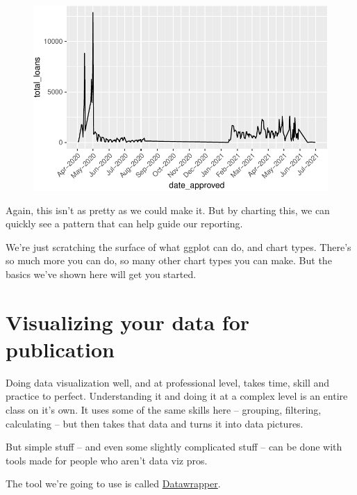 \documentclass[
  letterpaper,
  DIV=11,
  numbers=noendperiod]{scrreprt}
\begin{document}
\begin{figure}[H]

{\centering \includegraphics{./visualizing-for-reporting_files/figure-pdf/unnamed-chunk-15-1.pdf}

}

\end{figure}

Again, this isn't as pretty as we could make it. But by charting this,
we can quickly see a pattern that can help guide our reporting.

We're just scratching the surface of what ggplot can do, and chart
types. There's so much more you can do, so many other chart types you
can make. But the basics we've shown here will get you started.


\hypertarget{visualizing-your-data-for-publication}{%
\chapter{Visualizing your data for
publication}\label{visualizing-your-data-for-publication}}

Doing data visualization well, and at professional level, takes time,
skill and practice to perfect. Understanding it and doing it at a
complex level is an entire class on it's own. It uses some of the same
skills here -- grouping, filtering, calculating -- but then takes that
data and turns it into data pictures.

But simple stuff -- and even some slightly complicated stuff -- can be
done with tools made for people who aren't data viz pros.

The tool we're going to use is called
\href{https://www.datawrapper.de/}{Datawrapper}.
\end{document}
